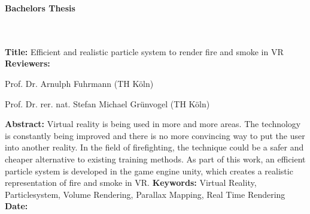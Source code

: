 \begin{flushleft}
    \begin{huge}
        \textbf{Bachelors Thesis}
    \end{huge}
    ~\\
    ~\\
    \textbf{Title:} Efficient and realistic particle system to render fire and smoke in VR
    ~\\
    \doublespacing
    \textbf{Reviewers:}
    \begin{description}
        \vspace{-0.2cm}
        \itemsep-8pt
        \item[–]
            Prof. Dr. Arnulph Fuhrmann (TH Köln)
        \item[–]
            Prof. Dr. rer. nat. Stefan Michael Grünvogel (TH Köln)
    \end{description}
    \vspace{-0.5cm}
    \singlespacing
    \textbf{Abstract:}
    Virtual reality is being used in more and more areas.
    The technology is constantly being improved and there is no more convincing way to put the user into another reality.
    In the field of firefighting, the technique could be a safer and cheaper alternative to existing training methods.
    As part of this work, an efficient particle system is developed in the game engine unity, which creates a realistic representation of fire and smoke in VR.
    \singlespacing
    \textbf{Keywords:} Virtual Reality, Particlesystem, Volume Rendering, Parallax Mapping, Real Time Rendering\\
    \doublespacing
    \textbf{Date:}
\end{flushleft}